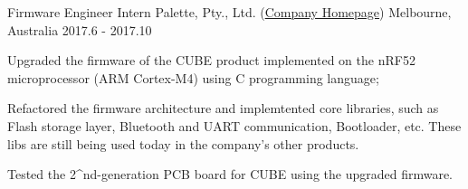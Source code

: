 \begin{cventries}
  \cventry
    {Firmware Engineer Intern}%
    {Palette, Pty., Ltd. (\href{https://palette.com/}{Company Homepage})}%
    {Melbourne, Australia}%
    {2017.6 - 2017.10}%
    {
      \begin{cvitems}
        \item Upgraded the firmware of the \textsc{CUBE} product implemented on the nRF52 microprocessor (ARM Cortex-M4) using C programming language;
        \item Refactored the firmware architecture and implemtented core libraries, such as Flash storage layer, Bluetooth and UART communication, Bootloader, etc. These libs are still being used today in the company's other products.
        \item Tested the 2^{nd}-generation PCB board for \textsc{CUBE} using the upgraded firmware.
      \end{cvitems}
    }
\end{cventries}
